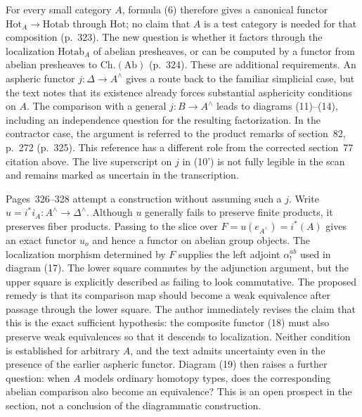 For every small category $A$, formula (6) therefore gives a canonical functor $\mathrm{Hot}_A\to\mathrm{Hotab}$ through $\mathrm{Hot}$; no claim that $A$ is a test category is needed for that composition (p.~323). The new question is whether it factors through the localization $\mathrm{Hotab}_A$ of abelian presheaves, or can be computed by a functor from abelian presheaves to $\mathrm{Ch.}(\mathrm{Ab})$ (p.~324). These are additional requirements. An aspheric functor $j:\Delta\to A^{\wedge}$ gives a route back to the familiar simplicial case, but the text notes that its existence already forces substantial asphericity conditions on $A$. The comparison with a general $j:B\to A^{\wedge}$ leads to diagrams (11)--(14), including an independence question for the resulting factorization. In the contractor case, the argument is referred to the product remarks of section~82, p.~272 (p.~325). This reference has a different role from the corrected section~77 citation above. The live superscript on $j$ in (10') is not fully legible in the scan and remains marked as uncertain in the transcription.

Pages~326--328 attempt a construction without assuming such a $j$. Write $u=i^*i_A:A^{\wedge}\to\Delta^{\wedge}$. Although $u$ generally fails to preserve finite products, it preserves fiber products. Passing to the slice over $F=u(e_{A^{\wedge}})=i^*(A)$ gives an exact functor $u_o$ and hence a functor on abelian group objects. The localization morphism determined by $F$ supplies the left adjoint $\alpha^{ab}_!$ used in diagram (17). The lower square commutes by the adjunction argument, but the upper square is explicitly described as failing to look commutative. The proposed remedy is that its comparison map should become a weak equivalence after passage through the lower square. The author immediately revises the claim that this is the exact sufficient hypothesis: the composite functor (18) must also preserve weak equivalences so that it descends to localization. Neither condition is established for arbitrary $A$, and the text admits uncertainty even in the presence of the earlier aspheric functor. Diagram (19) then raises a further question: when $A$ models ordinary homotopy types, does the corresponding abelian comparison also become an equivalence? This is an open prospect in the section, not a conclusion of the diagrammatic construction.

